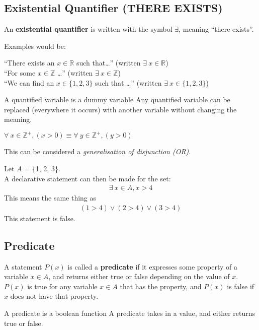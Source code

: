\documentclass[../notes.tex]{subfiles}
\begin{document}
			\subsection[Existential Quantifier]{Existential Quantifier (THERE EXISTS)}
				An \textbf{existential quantifier} is written with the symbol $\exists $, meaning ``there exists''.
				\begin{example}
					Examples would be:
					\begin{adjustwidth}{1cm}{}
						``There exists an $x \in \mathbb{R}$ such that\ldots'' (written $\exists \: x \in \mathbb{R}$)\\
						``For some $x \in \mathbb{Z}$ \ldots'' (written $\exists \: x \in \mathbb{Z}$)\\
						``We can find an $x \in \{1, 2, 3\}$ such that \ldots'' (written $\exists \: x \in \{1, 2, 3\}$)
					\end{adjustwidth}
				\end{example}
				\begin{sidenote}{A quantified variable is a dummy variable}
					Any quantified variable can be replaced (everywhere it occurs) with another variable without changing the meaning.
					\begin{example}
						$\forall \: x \in \mathbb{Z}^{+}, (x > 0) \equiv \forall \: y \in \mathbb{Z}^{+}, (y > 0)$
					\end{example}
				\end{sidenote}
				This can be considered a \textit{generalisation of disjunction (OR)}.
				\begin{example}
					Let $A$ = \{1, 2, 3\}.\\
					A declarative statement can then be made for the set:
					\begin{align*}
						\exists \: x \in A, x > 4
					\end{align*}
					This means the same thing as 
					\begin{align*}
						(1 > 4) \lor (2 > 4) \lor (3 > 4)
					\end{align*}
					This statement is false.
				\end{example}
			\subsection{Predicate}
				A statement $P(x)$ is called a \textbf{predicate} if it expresses some property of a variable $x \in A$, and returns either true or false depending on the value of $x$. $P(x)$ is true for any variable $x \in A$ that has the property, and $P(x)$ is false if $x$ does not have that property.
				\begin{sidenote}{A predicate is a boolean function}
					A predicate takes in a value, and either returns true or false.
				\end{sidenote}
\end{document}
